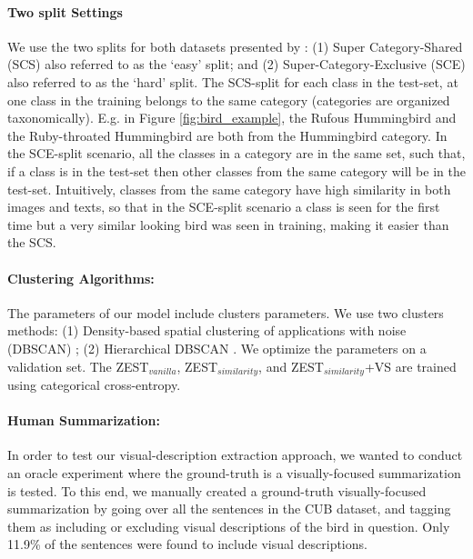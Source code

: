 \documentclass[11pt,a4paper]{article}
\begin{document}
\paragraph{Two split Settings} We use the two splits for both datasets presented by \citet{elhoseiny2017link}: (1) Super Category-Shared (SCS) also referred to as the \enquote*{easy} split; and (2) Super-Category-Exclusive (SCE) also referred to as the \enquote*{hard} split. The SCS-split for each class in the test-set, at one class in the training belongs to the same category (categories are organized taxonomically). E.g. in Figure \ref{fig:bird_example}, the Rufous Hummingbird and the Ruby-throated Hummingbird are both from the Hummingbird category. In the SCE-split scenario, all the classes in a category are in the same set, such that, if a class is in the test-set then other classes from the same category will be in the test-set. Intuitively, classes from the same category have high similarity in both images and texts, so that in the SCE-split scenario a class is seen for the first time but a very similar looking bird was seen in training, making it easier than the SCS.

\paragraph{Clustering Algorithms:}
The parameters of our model include clusters parameters.
We use two clusters methods: (1) Density-based spatial clustering of applications with noise (DBSCAN) \citep{ester1996density}; (2) Hierarchical DBSCAN \citep{mcinnes2017hdbscan}.
We optimize the parameters on a validation set. The ZEST$_{vanilla}$, ZEST$_{similarity}$, and ZEST$_{similarity}$+VS are trained using categorical cross-entropy.

\paragraph{Human Summarization:} 
In order to test our visual-description extraction approach, we wanted to conduct an oracle experiment where the ground-truth is a visually-focused summarization is tested. To this end, we manually created a ground-truth visually-focused summarization by going over all the sentences in the CUB dataset, and tagging them as including or excluding visual descriptions of the bird in question. Only 11.9\% of the sentences were found to include visual descriptions.  
\end{document}
